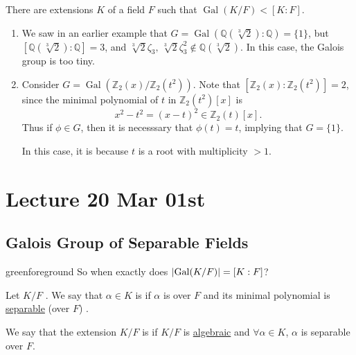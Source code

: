 \documentclass[notoc,notitlepage,nobib]{tufte-book}
\DeclareMathOperator{\Gal}{Gal}
\begin{document}
\begin{warning}
  There are extensions $K$ of a field $F$ such that $\Gal(K / F) < [ K : F ]$.
  \begin{enumerate}
    \item We saw in an earlier example that $G = \Gal( \mathbb{Q}(\sqrt[3]{2}) :
      \mathbb{Q} ) = \{ 1 \}$, but $[ \mathbb{Q}(\sqrt[3]{2}) : \mathbb{Q} ] =
      3$, and $\sqrt[3]{2} \zeta_3, \, \sqrt[3]{2} \zeta_3^2 \notin
      \mathbb{Q}(\sqrt[3]{2})$. In this case, the Galois group is too tiny.
    \item Consider $G = \Gal( \mathbb{Z}_2(x) / \mathbb{Z}_2(t^2) )$. Note that
      $[\mathbb{Z}_2(x) : \mathbb{Z}_2(t^2)] = 2$, since the minimal polynomial
      of $t$ in $\mathbb{Z}_2(t^2)[x]$ is
      \begin{equation*}
        x^2 - t^2 = (x - t)^2 \in \mathbb{Z}_2(t)[x].
      \end{equation*}
      Thus if $\phi \in G$, then it is necesssary that $\phi(t) = t$, implying
      that $G = \{ 1 \}$.

      In this case, it is because $t$ is a root with multiplicity $> 1$.
  \end{enumerate}
\end{warning}



\chapter{Lecture 20 Mar 01st}%
\label{chp:lecture_20_mar_01st}

\section{Galois Group of Separable Fields}%
\label{sec:galois_group_of_separable_fields}

\begin{quotebox}{green}{foreground}
  So when exactly does $\abs{ \Gal(K / F) } = [ K : F ]$?
\end{quotebox}

\begin{defn}\label{defn:separable_elements_and_separable_extensions}
  Let $K / F$ . We say that
  $\alpha \in K$ is  if $\alpha$ is  over
  $F$ and its minimal polynomial is
  \hyperref[defn:separable_polynomials]{separable} (over $F$) .

  We say that the extension $K / F$ is  if $K / F$ is
  \hyperref[defn:algebraic_and_transcendental]{algebraic} and $\forall \alpha
  \in K$, $\alpha$ is separable over $F$.
\end{defn}
\end{document}
